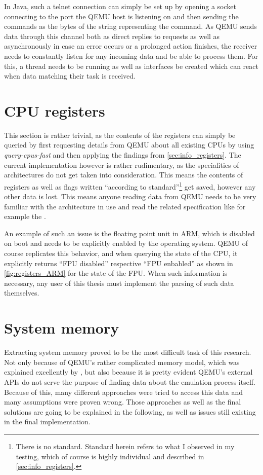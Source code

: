 In Java, such a telnet connection can simply be set up by opening a socket connecting to the port the QEMU host is listening on
and then sending the commands as the bytes of the string representing the command.
As QEMU sends data through this channel both as direct replies to requests as well as asynchronously
in case an error occurs or a prolonged action finishes,
the receiver needs to constantly listen for any incoming data and be able to process them.
For this, a thread needs to be running as well as interfaces be created
which can react when data matching their task is received.

\section{CPU registers}
This section is rather trivial, as the contents of the registers can simply be queried
by first requesting details from QEMU about all existing CPUs by using \emph{query-cpus-fast}
and then applying the findings from \autoref{sec:info_registers}.
The current implementation however is rather rudimentary,
as the specialities of architectures do not get taken into consideration.
This means the contents of registers as well as flags written
\enquote{according to standard}\footnote{There is no standard. Standard herein refers to what I observed in my testing, which of course is highly individual and described in \autoref{sec:info_registers}.}
get saved, however any other data is lost.
This means anyone reading data from QEMU needs to be very familiar with the architecture in use
and read the related specification like for example the .

An example of such an issue is the floating point unit in ARM,
which is disabled on boot and needs to be explicitly enabled by the operating system.
QEMU of course replicates this behavior,
and when querying the state of the CPU, it explicitly returns
\enquote{FPU disabled} respective \enquote{FPU enbabled}
as shown in \autoref{fig:registers_ARM} for the state of the FPU.
When such information is necessary, any user of this thesis must implement the parsing of such data themselves.

\section{System memory}
Extracting system memory proved to be the most difficult task of this research.
Not only because of QEMU's rather complicated memory model,
which was explained excellently by \cite{kitcheckpoints},
but also because it is pretty evident QEMU's external APIs do not serve the purpose of finding data about the emulation process itself.
Because of this, many different approaches were tried to access this data
and many assumptions were proven wrong.
Those approaches as well as the final solutions are going to be explained in the following,
as well as issues still existing in the final implementation.

